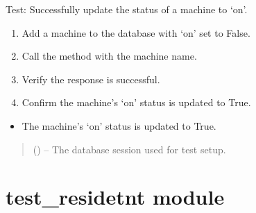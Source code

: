 \documentclass[letterpaper,10pt,english]{sphinxmanual}
\begin{document}
\begin{fulllineitems}
\label{\detokenize{test:test.test_machine.test_update_machine_status_success_on}}
\pysigstartsignatures
\pysiglinewithargsret
{}
{}
{}
\pysigstopsignatures
\sphinxAtStartPar
Test: Successfully update the status of a machine to ‘on’.
\begin{description}
\begin{enumerate}
%
\item {} 
\sphinxAtStartPar
Add a machine to the database with ‘on’ set to False.

\item {} 
\sphinxAtStartPar
Call the  method with the machine name.

\item {} 
\sphinxAtStartPar
Verify the response is successful.

\item {} 
\sphinxAtStartPar
Confirm the machine’s ‘on’ status is updated to True.

\end{enumerate}

\begin{itemize}
\item {} 
\sphinxAtStartPar
The machine’s ‘on’ status is updated to True.

\end{itemize}

\end{description}
\begin{quote}\begin{description}
\sphinxAtStartPar
{} () – The database session used for test setup.

\end{description}\end{quote}

\end{fulllineitems}



\section{test\_residetnt module}
\label{\detokenize{test:module-test.test_residetnt}}\label{\detokenize{test:test-residetnt-module}}
\end{document}
